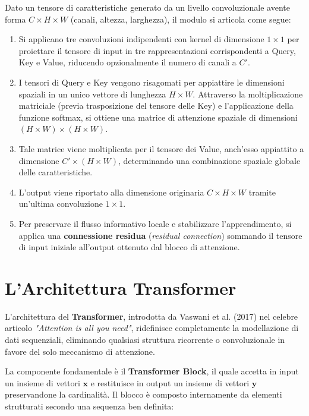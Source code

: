 ﻿\documentclass[11pt, a4paper]{article}
\begin{document}
Dato un tensore di caratteristiche generato da un livello convoluzionale avente forma $C \times H \times W$ (canali, altezza, larghezza), il modulo si articola come segue:
\begin{enumerate}
    \item Si applicano tre convoluzioni indipendenti con kernel di dimensione $1 \times 1$ per proiettare il tensore di input in tre rappresentazioni corrispondenti a Query, Key e Value, riducendo opzionalmente il numero di canali a $C'$.
    \item I tensori di Query e Key vengono risagomati per appiattire le dimensioni spaziali in un unico vettore di lunghezza $H \times W$. Attraverso la moltiplicazione matriciale (previa trasposizione del tensore delle Key) e l'applicazione della funzione softmax, si ottiene una matrice di attenzione spaziale di dimensioni $(H \times W) \times (H \times W)$.
    \item Tale matrice viene moltiplicata per il tensore dei Value, anch'esso appiattito a dimensione $C' \times (H \times W)$, determinando una combinazione spaziale globale delle caratteristiche.
    \item L'output viene riportato alla dimensione originaria $C \times H \times W$ tramite un'ultima convoluzione $1 \times 1$.
    \item Per preservare il flusso informativo locale e stabilizzare l'apprendimento, si applica una \textbf{connessione residua} (\emph{residual connection}) sommando il tensore di input iniziale all'output ottenuto dal blocco di attenzione.
\end{enumerate}

\newpage

\section{L'Architettura Transformer}

L'architettura del \textbf{Transformer}, introdotta da Vaswani et al. (2017) nel celebre articolo \emph{"Attention is all you need"}, ridefinisce completamente la modellazione di dati sequenziali, eliminando qualsiasi struttura ricorrente o convoluzionale in favore del solo meccanismo di attenzione.


La componente fondamentale è il \textbf{Transformer Block}, il quale accetta in input un insieme di vettori $\bm{x}$ e restituisce in output un insieme di vettori $\bm{y}$ preservandone la cardinalità. Il blocco è composto internamente da elementi strutturati secondo una sequenza ben definita:
\end{document}
